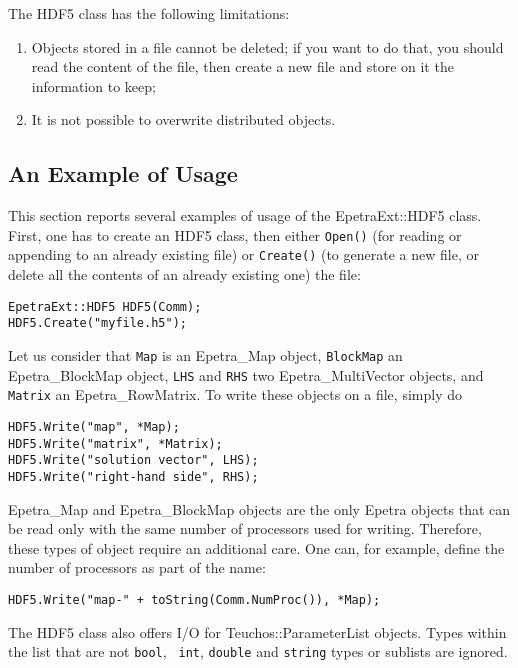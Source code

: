 \documentclass[11pt,relax]{SANDreport}
\begin{document}
The HDF5 class has the following limitations:
\begin{enumerate}
\item Objects stored in a file cannot be deleted; if you want to do that, you should read the 
  content of the file, then create a new file and store on it the information to keep;
\item It is not possible to overwrite distributed objects.
\end{enumerate}


\subsection{An Example of Usage}
\label{sec:hdf5:example}

This section reports several examples of usage of the EpetraExt::HDF5 class. 
First, one has to create an HDF5 class, then either {\tt Open()} 
(for reading or appending to an already existing file) or 
{\tt Create()} (to generate a new file, or delete all the contents of an
                already existing one) the file:
\begin{verbatim}
EpetraExt::HDF5 HDF5(Comm);
HDF5.Create("myfile.h5");
\end{verbatim}
Let us consider that {\tt Map} is an Epetra\_Map object, {\tt BlockMap} an
Epetra\_BlockMap object, {\tt LHS} and {\tt RHS} two Epetra\_MultiVector
objects, and {\tt Matrix} an Epetra\_RowMatrix. To write these objects on a
file, simply do
\begin{verbatim}
HDF5.Write("map", *Map);
HDF5.Write("matrix", *Matrix);
HDF5.Write("solution vector", LHS);
HDF5.Write("right-hand side", RHS);
\end{verbatim}
Epetra\_Map and Epetra\_BlockMap objects are the only Epetra objects
that can be read only with the same number of processors used for writing.
Therefore, these types of object require an additional care. One can, for
example, define the number of processors as part of the name:
\begin{verbatim}
HDF5.Write("map-" + toString(Comm.NumProc()), *Map);
\end{verbatim}

The HDF5 class also offers I/O for Teuchos::ParameterList objects. Types
within the list that are not {\tt bool}, {\tt
  int}, {\tt double} and {\tt string} types or sublists are ignored.
\end{document}
